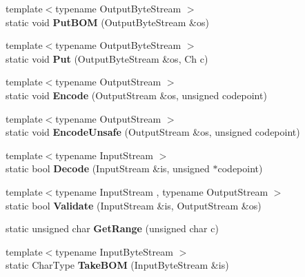 \begin{DoxyCompactItemize}
\item 
{\footnotesize template$<$typename Output\+Byte\+Stream $>$ }\\static void {\bfseries Put\+B\+OM} (Output\+Byte\+Stream \&os)\hypertarget{struct_u_t_f8_a6b171e5f0662ad81d498875bbdbc536a}{}\label{struct_u_t_f8_a6b171e5f0662ad81d498875bbdbc536a}

\item 
{\footnotesize template$<$typename Output\+Byte\+Stream $>$ }\\static void {\bfseries Put} (Output\+Byte\+Stream \&os, Ch c)\hypertarget{struct_u_t_f8_ab24c23227413798e9be28a21eb26fe51}{}\label{struct_u_t_f8_ab24c23227413798e9be28a21eb26fe51}

\item 
{\footnotesize template$<$typename Output\+Stream $>$ }\\static void {\bfseries Encode} (Output\+Stream \&os, unsigned codepoint)\hypertarget{struct_u_t_f8_af286ed19ca60d261a9b11b65bee1298b}{}\label{struct_u_t_f8_af286ed19ca60d261a9b11b65bee1298b}

\item 
{\footnotesize template$<$typename Output\+Stream $>$ }\\static void {\bfseries Encode\+Unsafe} (Output\+Stream \&os, unsigned codepoint)\hypertarget{struct_u_t_f8_aac6bdaf03c114265384b2ae3e425e7a8}{}\label{struct_u_t_f8_aac6bdaf03c114265384b2ae3e425e7a8}

\item 
{\footnotesize template$<$typename Input\+Stream $>$ }\\static bool {\bfseries Decode} (Input\+Stream \&is, unsigned $\ast$codepoint)\hypertarget{struct_u_t_f8_a17c6badb31acf4f784111c886737fb17}{}\label{struct_u_t_f8_a17c6badb31acf4f784111c886737fb17}

\item 
{\footnotesize template$<$typename Input\+Stream , typename Output\+Stream $>$ }\\static bool {\bfseries Validate} (Input\+Stream \&is, Output\+Stream \&os)\hypertarget{struct_u_t_f8_a9e2e7e37d819baeb5e643654c6e61e33}{}\label{struct_u_t_f8_a9e2e7e37d819baeb5e643654c6e61e33}

\item 
static unsigned char {\bfseries Get\+Range} (unsigned char c)\hypertarget{struct_u_t_f8_ac06bbf38df41adb0c7b9eaa93f85cc38}{}\label{struct_u_t_f8_ac06bbf38df41adb0c7b9eaa93f85cc38}

\item 
{\footnotesize template$<$typename Input\+Byte\+Stream $>$ }\\static Char\+Type {\bfseries Take\+B\+OM} (Input\+Byte\+Stream \&is)\hypertarget{struct_u_t_f8_a1b2359d6ea50ae32fefc9b28e9878a31}{}\label{struct_u_t_f8_a1b2359d6ea50ae32fefc9b28e9878a31}


\end{DoxyCompactItemize}
